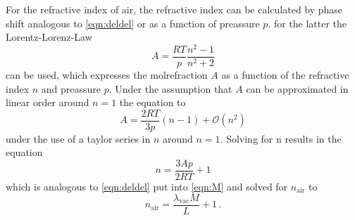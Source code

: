 For the refractive index of air, the refractive index can be calculated by phase shift analogous to \autoref{eqn:deldel} or as a function of preassure $p$.
for the latter the Lorentz-Lorenz-Law 
\begin{equation}
    A = \frac{RT}{p} \frac{n^2-1}{n^2+2}
\end{equation}
can be used, which expresses the molrefraction $A$ as a function of the refractive index $n$ and preassure $p$.
Under the assumption that $A$ can be approximated in linear order around $n = 1$ the equation to 
\begin{equation}
    A = \frac{2RT}{3p} \left(n-1\right) + \mathcal{O}\left( n^2 \right)
\end{equation}
under the use of a taylor series in $n$ around $n =1 $.
Solving for n results in the equation
\begin{equation}
    n = \frac{3Ap}{2RT} + 1
\end{equation}
which is analogous to \autoref{eqn:deldel} put into \autoref{eqn:M} and solved for $n_\text{air}$ to
\begin{equation}
    n_\text{air} = \frac{\lambda_\text{vac} M}{L} + 1 \, .
\end{equation}
\newpage
